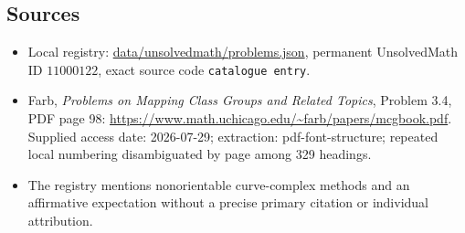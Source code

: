 \documentclass[11pt]{article}
\begin{document}
\subsection{Sources}
\begin{itemize}
\item Local registry: \url{data/unsolvedmath/problems.json}, permanent UnsolvedMath ID $11000122$, exact source code \texttt{catalogue entry}.
\item Farb, \emph{Problems on Mapping Class Groups and Related Topics}, Problem 3.4, PDF page 98: \url{https://www.math.uchicago.edu/~farb/papers/mcgbook.pdf}. Supplied access date: 2026-07-29; extraction: pdf-font-structure; repeated local numbering disambiguated by page among 329 headings.
\item The registry mentions nonorientable curve-complex methods and an affirmative expectation without a precise primary citation or individual attribution.
\end{itemize}
\end{document}
